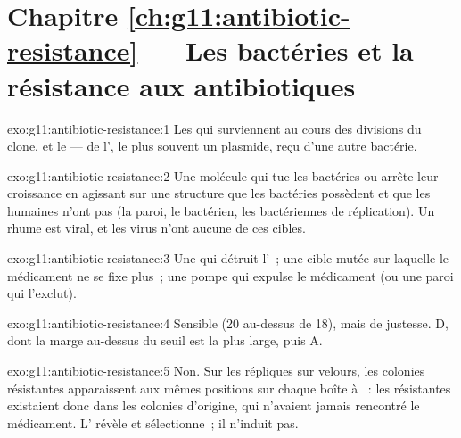 \section*{Chapitre \ref{ch:g11:antibiotic-resistance} --- Les bactéries et la résistance aux antibiotiques}

\begin{solution}{exo:g11:antibiotic-resistance:1}
Les  qui surviennent au cours des divisions du clone, et le
 --- de l', le plus souvent un
plasmide, reçu d'une autre bactérie.
\end{solution}

\begin{solution}{exo:g11:antibiotic-resistance:2}
Une molécule qui tue les bactéries ou arrête leur croissance en
agissant sur une structure que les bactéries possèdent et que les
 humaines n'ont pas (la paroi, le  bactérien, les
 bactériennes de réplication). Un rhume est viral, et les virus
n'ont aucune de ces cibles.
\end{solution}

\begin{solution}{exo:g11:antibiotic-resistance:3}
Une  qui détruit l'~; une cible mutée sur laquelle le
médicament ne se fixe plus~; une pompe qui expulse le médicament (ou
une paroi qui l'exclut).
\end{solution}

\begin{solution}{exo:g11:antibiotic-resistance:4}
Sensible (20 au-dessus de 18), mais de justesse. D, dont la marge
au-dessus du seuil est la plus large, puis A.
\end{solution}

\begin{solution}{exo:g11:antibiotic-resistance:5}
Non. Sur les répliques sur velours, les colonies résistantes
apparaissent aux mêmes positions sur chaque boîte à ~: les
 résistantes existaient donc dans les colonies d'origine, qui
n'avaient jamais rencontré le médicament. L' révèle et
sélectionne~; il n'induit pas.
\end{solution}

